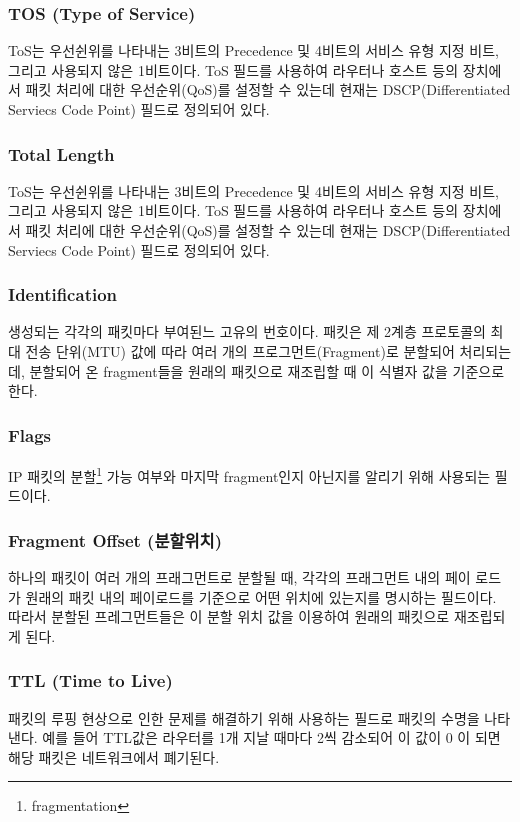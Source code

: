     \subsubsection*{TOS (Type of Service)}
    ToS는 우선쉰위를 나타내는 3비트의 Precedence 및 4비트의 서비스 유형 지정 비트, 그리고 사용되지 않은 1비트이다. ToS 필드를 사용하여 라우터나 호스트 등의 장치에서 패킷 처리에 대한 우선순위(QoS)를 설정할 수 있는데 현재는 DSCP(Differentiated Serviecs Code Point) 필드로 정의되어 있다.
    \vspace{-1mm}
    \subsubsection*{Total Length}
    ToS는 우선쉰위를 나타내는 3비트의 Precedence 및 4비트의 서비스 유형 지정 비트, 그리고 사용되지 않은 1비트이다. ToS 필드를 사용하여 라우터나 호스트 등의 장치에서 패킷 처리에 대한 우선순위(QoS)를 설정할 수 있는데 현재는 DSCP(Differentiated Serviecs Code Point) 필드로 정의되어 있다.
    \vspace{-1mm}
    \subsubsection*{Identification}
    생성되는 각각의 패킷마다 부여된느 고유의 번호이다. 패킷은 제 2계층 프로토콜의 최대 전송 단위(MTU) 값에 따라 여러 개의 프로그먼트(Fragment)로 분할되어 처리되는데, 분할되어 온 fragment들을 원래의 패킷으로 재조립할 때 이 식별자 값을 기준으로 한다.
    \vspace{-1mm}
    \subsubsection*{Flags}
    IP 패킷의 분할\footnote{fragmentation} 가능 여부와 마지막 fragment인지 아닌지를 알리기 위해 사용되는 필드이다.
    \vspace{-1mm}
    \subsubsection*{Fragment Offset (분할위치)}
    하나의 패킷이 여러 개의 프래그먼트로 분할될 때, 각각의 프래그먼트 내의 페이 로드가 원래의 패킷 내의 페이로드를 기준으로 어떤 위치에 있는지를 명시하는 필드이다. 따라서 분할된 프레그먼트들은 이 분할 위치 값을 이용하여 원래의 패킷으로 재조립되게 된다.
    \vspace{-1mm}
    \subsubsection*{TTL (Time to Live)}
    패킷의 루핑 현상으로 인한 문제를 해결하기 위해 사용하는 필드로 패킷의 수명을 나타낸다. 예를 들어 TTL값은 라우터를 1개 지날 때마다 2씩 감소되어 이 값이 0 이 되면 해당 패킷은 네트워크에서 폐기된다.
    \vspace{-1mm}
